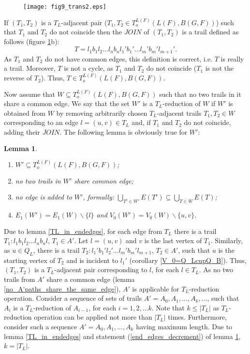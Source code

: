 \documentclass[a4paper, 12pt]{article}
\newtheorem{lemma}{Lemma}[subsection]
\begin{document}
\begin{figure}[h]
\begin{center}
\texttt{[image: fig9\_trans2.eps]}\\
\caption{}\label{fig_trans2}
\end{center}
\end{figure}

If $(T_1, T_2)$ is a $T_L$-adjacent pair ($T_1, T_2 \in
T_o^{L(F)}(L(F),B(G,F))$) such that $T_1$ and $T_2$ do not coincide
then the $JOIN$ of $(T_1, T_2)$ is a trail defined as follows
(figure \ref{fig_trans2}b):
$$T = l_1 b_1 l_2 ... l_n b_n l_1' b_1' ... l_m' b_m' l_{m+1}'.$$
As $T_1$ and $T_2$ do not have common edges, this definition is
correct, i.e. $T$ is really a trail. Moreover, $T$ is not a cycle,
as $T_1$ and $T_2$ do not coincide ($T_1$ is not the reverse of
$T_2$). Thus, $T \in T_o^{L(F)}(L(F),B(G,F))$.

Now assume that $W \subseteq T_o^{L(F)}(L(F),B(G,F))$ such that no
two trails in it share a common edge. We say that the set $W'$ is a
$T_L$-reduction of $W$ if $W'$ is obtained from $W$ by removing
arbitrarily chosen $T_L$-adjacent trails $T_1, T_2 \in W$
corresponding to an edge $l=(u,v) \in T_L$ and, if $T_1$ and $T_2$
do not coincide, adding their $JOIN$. The following lemma is
obviously true for $W'$:
\begin{lemma}\label{W'_properties}\
\renewcommand{\labelenumi}{(\arabic{enumi})}
\begin{enumerate}
\item \label{W'_in_T_o} $W' \subseteq T_o^{L(F)}(L(F),B(G,F))$;
\item \label{preserve} no two trails in $W'$ share common edge;
\item \label{no_new_edge} no edge is added to $W'$, formally: $\displaystyle \bigcup_{T' \in W'}E(T') \subseteq \bigcup_{T \in W}E(T)$;
\item \label{end_edges_decrement} $E_1(W') = E_1(W) \backslash \{l\}$ and $V_0(W') = V_0(W) \backslash \{u, v\}$.
\end{enumerate}
\end{lemma}

Due to lemma \ref{TL_in_endedges}, for each edge from $T_L$ there is
a trail $T_1 : l_1 b_1 l_2 ... l_n b_n l$, $T_1 \in A'$. Let $l =
(u,v)$ and $v$ is the last vertex of $T_1$. Similarly, as $u \in
Q_L$, there is a trail $T_2 : l_1' b_1' l_2' ... l_m' b_m' l_{m+1}$,
$T_2 \in A'$, such that $u$ is the starting vertex of $T_2$ and is
incident to $l_1'$ (corollary \ref{V_0=Q_LcupQ_B}). Thus,
$(T_1,T_2)$ is a $T_L$-adjacent pair corresponding to $l$, for each
$l \in T_L$. As no two trails from $A'$ share a common edge (lemma
\ref{no_A'paths_share_the_same_edge}), $A'$ is applicable for
$T_L$-reduction operation. Consider a sequence of sets of trails
$A'=A_0, A_1,..., A_k, ...$, such that $A_i$ is a $T_L$-reduction of
$A_{i-1}$, for each $i = 1,2,...k$. Note that $k \leq |T_L|$ as
$T_L$-reduction operation can be applied not more than $|T_L|$
times. Furthermore, consider such a sequence $A'=A_0, A_1,..., A_k$
having maximum length. Due to lemma \ref{TL_in_endedges} and
statement (\ref{end_edges_decrement}) of lemma \ref{W'_properties},
$k = |T_L|$.
\end{document}

